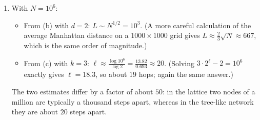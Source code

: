 \documentclass[a4paper,12pt]{article}
\begin{document}
\begin{enumerate}[label=(\alph*)]
\item With $N=10^6$:
\begin{itemize}
\item From (b) with $d=2$: $L \sim N^{1/2} = 10^3$. (A more careful calculation of the average Manhattan distance on a $1000 \times 1000$ grid gives $L \approx \frac{2}{3}\sqrt{N} \approx 667$, which is the same order of magnitude.)
\item From (c) with $k=3$: $\ell \approx \frac{\log 10^6}{\log 2} = \frac{13.82}{0.693} \approx 20$. (Solving $3 \cdot 2^{\ell}-2 = 10^6$ exactly gives $\ell = 18.3$, so about $19$ hops; again the same answer.)
\end{itemize}
The two estimates differ by a factor of about $50$: in the lattice two nodes of a million are typically a thousand steps apart, whereas in the tree-like network they are about $20$ steps apart.

\end{enumerate}
\end{document}
